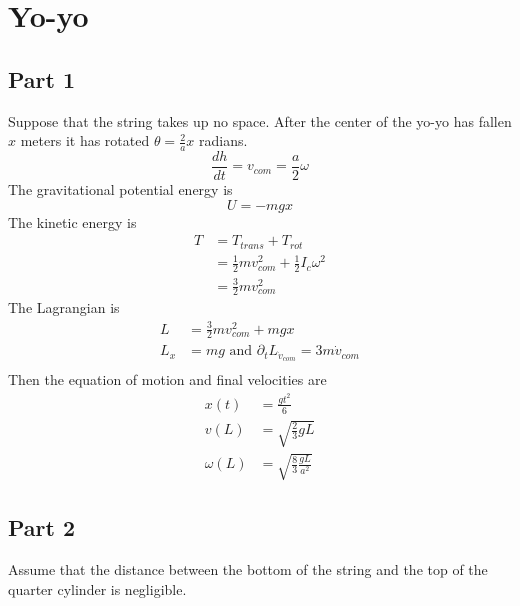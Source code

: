 \section{Yo-yo}

\subsection{Part 1}
Suppose that the string takes up no space. After the center of the yo-yo has fallen $x$ meters it has rotated $\theta = \frac{2}{a}x$ radians.
\begin{equation}
    \frac{dh}{dt} = v_{com} = \frac{a}{2}\omega
\end{equation}
The gravitational potential energy is
\begin{equation}
    U = -mgx
\end{equation}
The kinetic energy is
\begin{equation}
\begin{split}
    T &= T_{trans} + T_{rot}\\
    &= \frac{1}{2}mv_{com}^2+\frac{1}{2}I_c\omega^2\\
    &= \frac{3}{2}mv_{com}^2
\end{split}
\end{equation}
The Lagrangian is
\begin{equation}
    \begin{split}
        L &= \frac{3}{2}mv_{com}^2+mgx\\
        L_x &= mg \textrm{ and } \partial_t L_{\dot{v}_{com}} = 3m\dot{v}_{com}\\
    \end{split}
\end{equation}
Then the equation of motion and final velocities are
\begin{equation}
    \begin{split}
        x(t) &= \frac{gt^2}{6}\\
        v(L) &= \sqrt{\frac{2}{3}gL}\\
       \omega(L) &= \sqrt{\frac{8}{3}\frac{gL}{a^2}}
    \end{split}
\end{equation}

\subsection{Part 2}
Assume that the distance between the bottom of the string and the top of the quarter cylinder is negligible.

